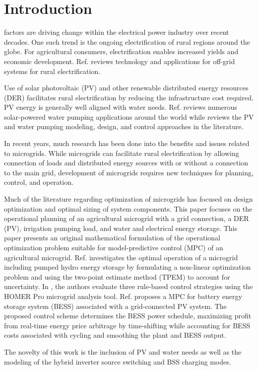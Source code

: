 \section{Introduction}
\label{sec:intro}

 factors are driving change within the electrical power industry over recent decades.
One such trend is the ongoing electrification of rural regions around the globe.
For agricultural consumers, electrification enables increased yields and economic development.
Ref. \cite{Mandelli2016} reviews technology and applications for off-grid systems for rural electrification.

Use of solar photovoltaic (PV) and other renewable distributed energy resources (DER) facilitates rural electrification by reducing the infrastructure cost required.
PV energy is generally well aligned with water needs\cite{Aliyu2018}.
Ref. \cite{Aliyu2018} reviews numerous solar-powered water pumping applications around the world while \cite{Muhsen2017} reviews the PV and water pumping modeling, design, and control approaches in the literature.

In recent years, much research has been done into the benefits and issues related to microgrids\cite{Chandak2021,Choudhury2020}.
While microgrids can facilitate rural electrification by allowing connection of loads and distributed energy sources with or without a connection to the main grid,
development of microgrids requires new techniques for planning, control, and operation\cite{Bhuiyan2014,Reca-Cardena2018}.

Much of the literature regarding optimization of microgrids has focused on design optimization and optimal sizing of system components\cite{Bhuiyan2014,Dawoud2018}.
This paper focuses on the operational planning of an agricultural microgrid with a grid connection, a DER (PV), irrigation pumping load, and water and electrical energy storage.
This paper presents an original mathematical formulation of the operational optimization problem suitable for model-predictive control (MPC) of an agricultural microgrid.
Ref. \cite{Ghasemi2018} investigates the optimal operation of a microgrid including pumped hydro energy storage by formulating a non-linear optimization problem and using the two-point estimate method (TPEM) to account for uncertainty. 
In \cite{Shoeb2018}, the authors evaluate three rule-based control strategies using the HOMER Pro microgrid analysis tool.
Ref. \cite{Wang2014} proposes a MPC for battery energy storage system (BESS) associated with a grid-connected PV system. The proposed control scheme determines the BESS power schedule, maximizing profit from real-time energy price arbitrage by time-shifting while accounting for BESS costs associated with cycling and smoothing the plant and BESS output.

The novelty of this work is the inclusion of PV and water needs as well as the modeling of the hybrid inverter source switching and BSS charging modes.
